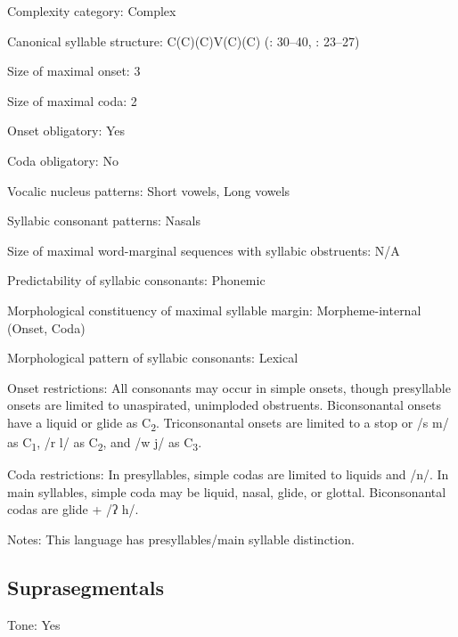 {\begin{appendixdesc}
\item[Complexity category:] Complex

\item[Canonical syllable structure:] C(C)(C)V(C)(C) (\citealt{Olsen2014}: 30--40, \citealt{Manley1972}: 23--27)

\item[Size of maximal onset:] 3

\item[Size of maximal coda:] 2

\item[Onset obligatory:] Yes

\item[Coda obligatory:] No

\item[Vocalic nucleus patterns:] Short vowels, Long vowels

\item[Syllabic consonant patterns:] Nasals

\item[Size of maximal word-marginal sequences with syllabic obstruents:] N/A

\item[Predictability of syllabic consonants:] Phonemic

\item[Morphological constituency of maximal syllable margin:] Morpheme-internal (Onset, Coda)

\item[Morphological pattern of syllabic consonants:] Lexical

\item[Onset restrictions:] All consonants may occur in simple onsets, though presyllable onsets are limited to unaspirated, unimploded obstruents. Biconsonantal onsets have a liquid or glide as C\textsubscript{2}. Triconsonantal onsets are limited to a stop or /s m/ as C\textsubscript{1}, /r l/ as C\textsubscript{2}, and /w j/ as C\textsubscript{3}.

\item[Coda restrictions:] In presyllables, simple codas are limited to liquids and /n/. In main syllables, simple coda may be liquid, nasal, glide, or glottal. Biconsonantal codas are glide + /ʔ h/.

\item[Notes:] This language has presyllables/main syllable distinction.
\end{appendixdesc}
\subsection*{Suprasegmentals}
\begin{appendixdesc}
\item[Tone:] Yes


\end{appendixdesc}}
